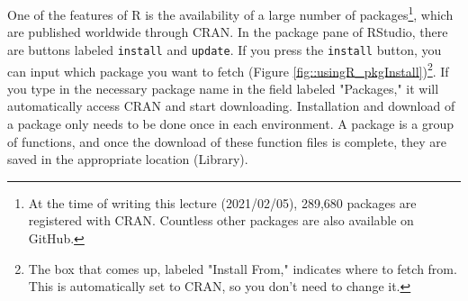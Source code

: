 \documentclass{ltjsbook}
\begin{document}
One of the features of R is the availability of a large number of packages\footnote{At the time of writing this lecture (2021/02/05), 289,680 packages are registered with CRAN. Countless other packages are also available on GitHub.}, which are published worldwide through CRAN. In the package pane of RStudio, there are buttons labeled \texttt{install} and \texttt{update}. If you press the \texttt{install} button, you can input which package you want to fetch (Figure \ref{fig::usingR_pkgInstall})\footnote{The box that comes up, labeled "Install From," indicates where to fetch from. This is automatically set to CRAN, so you don't need to change it.}. If you type in the necessary package name in the field labeled "Packages," it will automatically access CRAN and start downloading. Installation and download of a package only needs to be done once in each environment. A package is a group of functions, and once the download of these function files is complete, they are saved in the appropriate location (Library).
\end{document}
